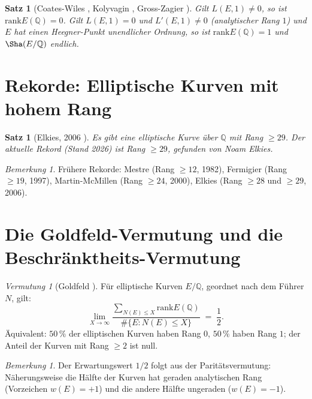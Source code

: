 \documentclass[12pt,a4paper]{amsart}
\newtheorem{satz}[theorem]{Satz}
\theoremstyle{definition}
\theoremstyle{remark}
\newtheorem{bemerkung}[theorem]{Bemerkung}
\newtheorem{vermutung}[theorem]{Vermutung}
\newcommand{\Q}{\mathbb{Q}}
\newcommand{\rank}{\mathrm{rank}}
\begin{document}
\begin{satz}[Coates-Wiles \cite{CW1977}, Kolyvagin \cite{Kolyvagin1988},
  Gross-Zagier \cite{GZ1986}]
  Gilt $L(E,1) \neq 0$, so ist $\rank E(\Q) = 0$.
  Gilt $L(E,1) = 0$ und $L'(E,1) \neq 0$ (analytischer Rang $1$) und $E$ hat einen
  Heegner-Punkt unendlicher Ordnung, so ist $\rank E(\Q) = 1$ und $\Sha(E/\Q)$ endlich.
\end{satz}

\section{Rekorde: Elliptische Kurven mit hohem Rang}\label{sec:rekorde}

\begin{satz}[Elkies, 2006 \cite{Elkies2006}]
  Es gibt eine elliptische Kurve über $\Q$ mit Rang $\geq 29$.
  Der aktuelle Rekord (Stand 2026) ist Rang $\geq 29$, gefunden von Noam Elkies.
\end{satz}

\begin{bemerkung}
  Frühere Rekorde: Mestre \cite{Mestre1982} (Rang $\geq 12$, 1982),
  Fermigier (Rang $\geq 19$, 1997),
  Martin-McMillen (Rang $\geq 24$, 2000),
  Elkies (Rang $\geq 28$ und $\geq 29$, 2006).
\end{bemerkung}

\section{Die Goldfeld-Vermutung und die Beschränktheits-Vermutung}\label{sec:goldfeld}

\begin{vermutung}[Goldfeld \cite{Goldfeld1979}]\label{verm:goldfeld}
  Für elliptische Kurven $E/\Q$, geordnet nach dem Führer $N$, gilt:
  \[
    \lim_{X\to\infty} \frac{\sum_{N(E) \leq X} \rank E(\Q)}
                           {\#\{E : N(E) \leq X\}}
    \;=\; \frac{1}{2}.
  \]
  Äquivalent: $50\,\%$ der elliptischen Kurven haben Rang $0$, $50\,\%$ haben Rang $1$;
  der Anteil der Kurven mit Rang $\geq 2$ ist null.
\end{vermutung}

\begin{bemerkung}
  Der Erwartungswert $1/2$ folgt aus der Paritätsvermutung: Näherungsweise die Hälfte
  der Kurven hat geraden analytischen Rang (Vorzeichen $w(E) = +1$) und die andere Hälfte
  ungeraden ($w(E) = -1$).
\end{bemerkung}
\end{document}
